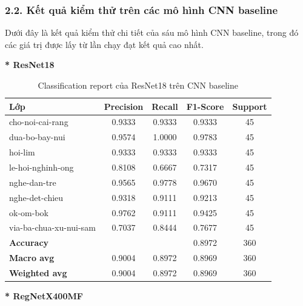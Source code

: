 \subsubsection{2.2. Kết quả kiểm thử trên các mô hình CNN baseline}
\indent\indent Dưới đây là kết quả kiểm thử chi tiết của sáu mô hình CNN baseline, trong đó các giá trị được lấy từ lần chạy đạt kết quả cao nhất.\vspace{0.3cm}

\textbf{* ResNet18}
\begin{table}[H]
\centering
\renewcommand{\arraystretch}{1.0}
\caption{Classification report của ResNet18 trên CNN baseline}
\label{tab:CRResNet18}
\begin{tabular}{lcccc}
\hline
\textbf{Lớp} & \textbf{Precision} & \textbf{Recall} & \textbf{F1-Score} & \textbf{Support} \\
\hline
cho-noi-cai-rang          & 0.9333 & 0.9333 & 0.9333 & 45 \\
dua-bo-bay-nui             & 0.9574 & 1.0000 & 0.9783 & 45 \\
hoi-lim                    & 0.9333 & 0.9333 & 0.9333 & 45 \\
le-hoi-nghinh-ong          & 0.8108 & 0.6667 & 0.7317 & 45 \\
nghe-dan-tre               & 0.9565 & 0.9778 & 0.9670 & 45 \\
nghe-det-chieu             & 0.9318 & 0.9111 & 0.9213 & 45 \\
ok-om-bok                  & 0.9762 & 0.9111 & 0.9425 & 45 \\
via-ba-chua-xu-nui-sam     & 0.7037 & 0.8444 & 0.7677 & 45 \\
\hline
\textbf{Accuracy}          & & & 0.8972 & 360 \\
\textbf{Macro avg}         & 0.9004 & 0.8972 & 0.8969 & 360 \\
\textbf{Weighted avg}      & 0.9004 & 0.8972 & 0.8969 & 360 \\
\hline
\end{tabular}
\end{table}
\newpage
\textbf{* RegNetX400MF}
